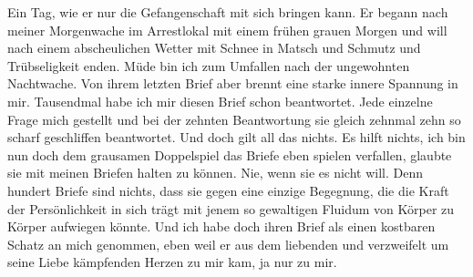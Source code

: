 \def\day{12. April 1943}
\mktitle

Ein Tag, wie er nur die Gefangenschaft mit sich bringen kann.
Er begann nach meiner Morgenwache im Arrestlokal mit einem fr\"{u}hen grauen Morgen und will nach einem abscheulichen Wetter mit Schnee in Matsch und Schmutz und Tr\"{u}bseligkeit enden.
M\"{u}de bin ich zum Umfallen nach der ungewohnten Nachtwache.
Von ihrem letzten Brief aber brennt eine starke innere Spannung in mir.
Tausendmal habe ich mir diesen Brief schon beantwortet.
Jede einzelne Frage mich gestellt und bei der zehnten Beantwortung sie gleich zehnmal zehn so scharf geschliffen beantwortet.
Und doch gilt all das nichts.
Es hilft nichts, ich bin nun doch dem grausamen Doppelspiel das Briefe eben spielen verfallen, glaubte sie mit meinen Briefen halten zu k\"{o}nnen.
Nie, wenn sie es nicht will.
Denn hundert Briefe sind nichts, dass sie gegen eine einzige Begegnung, die die Kraft der Pers\"{o}nlichkeit in sich tr\"{a}gt mit jenem so gewaltigen Fluidum von K\"{o}rper zu K\"{o}rper aufwiegen k\"{o}nnte.
Und ich habe doch ihren Brief als einen kostbaren Schatz an mich genommen, eben weil er aus dem liebenden und verzweifelt um seine Liebe k\"{a}mpfenden Herzen zu mir kam, ja nur zu mir.


\clearpage
